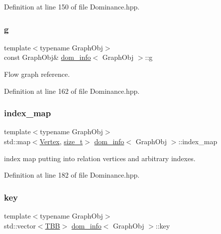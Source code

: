 Definition at line 150 of file Dominance.\+hpp.

\mbox{\label{classdom__info_a6cd48ccbc3af5826247fcea773b4d65b}} 
\subsubsection{\texorpdfstring{g}{g}}
{\footnotesize\ttfamily template$<$typename Graph\+Obj$>$ \\
const Graph\+Obj\& \hyperlink{classdom__info}{dom\+\_\+info}$<$ Graph\+Obj $>$\+::g\hspace{0.3cm}{\ttfamily [private]}}



Flow graph reference. 



Definition at line 162 of file Dominance.\+hpp.

\mbox{\label{classdom__info_aedfb2f00293356e11a413f995e1063b8}} 
\subsubsection{\texorpdfstring{index\+\_\+map}{index\_map}}
{\footnotesize\ttfamily template$<$typename Graph\+Obj$>$ \\
std\+::map$<$\hyperlink{classdom__info_a5e4ca21e2c5281bdbb95d2c8d965c9be}{Vertex}, \hyperlink{tutorial__fpt__2017_2intro_2sixth_2test_8c_a7c94ea6f8948649f8d181ae55911eeaf}{size\+\_\+t}$>$ \hyperlink{classdom__info}{dom\+\_\+info}$<$ Graph\+Obj $>$\+::index\+\_\+map\hspace{0.3cm}{\ttfamily [private]}}



index map putting into relation vertices and arbitrary indexes. 



Definition at line 182 of file Dominance.\+hpp.

\mbox{\label{classdom__info_ab9a443369069fb66f7eb8c4f7f258614}} 
\subsubsection{\texorpdfstring{key}{key}}
{\footnotesize\ttfamily template$<$typename Graph\+Obj$>$ \\
std\+::vector$<$\hyperlink{Dominance_8hpp_ac35ffd4ddeccae8225d6ec6f55d65a97}{T\+BB}$>$ \hyperlink{classdom__info}{dom\+\_\+info}$<$ Graph\+Obj $>$\+::key\hspace{0.3cm}{\ttfamily [private]}}



